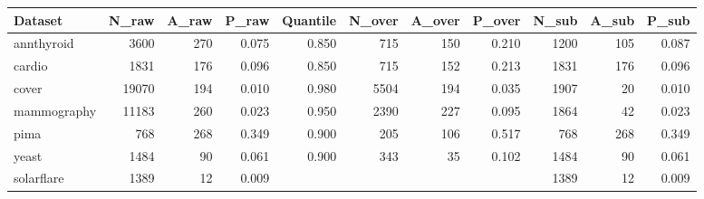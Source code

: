 \begin{tabular}{l|rrr|rrrr|rrr}
  \toprule
Dataset & N\_raw & A\_raw & P\_raw & Quantile & N\_over & A\_over & P\_over & N\_sub & A\_sub & P\_sub \\ 
  \midrule
annthyroid & 3600 &  270 & 0.075 & 0.850 &  715 &  150 & 0.210 & 1200 &  105 & 0.087 \\ 
  cardio & 1831 &  176 & 0.096 & 0.850 &  715 &  152 & 0.213 & 1831 &  176 & 0.096 \\ 
  cover & 19070 &  194 & 0.010 & 0.980 & 5504 &  194 & 0.035 & 1907 &   20 & 0.010 \\ 
  mammography & 11183 &  260 & 0.023 & 0.950 & 2390 &  227 & 0.095 & 1864 &   42 & 0.023 \\ 
  pima &  768 &  268 & 0.349 & 0.900 &  205 &  106 & 0.517 &  768 &  268 & 0.349 \\ 
  yeast & 1484 &   90 & 0.061 & 0.900 &  343 &   35 & 0.102 & 1484 &   90 & 0.061 \\ 
  solarflare & 1389 &   12 & 0.009 &  &  &  &  & 1389 &   12 & 0.009 \\ 
   \bottomrule
\end{tabular}
